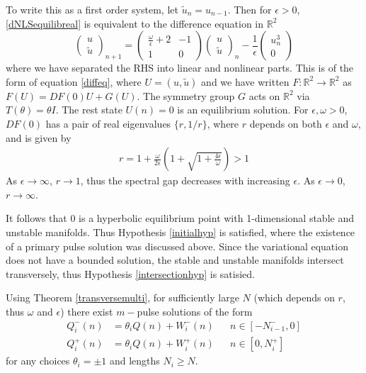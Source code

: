 \documentclass[12pt]{article}
\def\R{{\mathbb R}}
\begin{document}
To write this as a first order system, let $\tilde{u}_n = u_{n-1}$. Then for $\epsilon > 0$, \eqref{dNLSequilibreal} is equivalent to the difference equation in $\R^2$
\begin{equation}\label{dnlsdiffR2}
\begin{pmatrix}
u \\ \tilde{u}
\end{pmatrix}_{n+1} =
\begin{pmatrix}
\frac{\omega}{\epsilon} + 2 & -1 \\
1 & 0
\end{pmatrix}
\begin{pmatrix}
u \\ \tilde{u}
\end{pmatrix}_n
- \frac{1}{\epsilon} 
\begin{pmatrix}
u_n^3 \\ 0
\end{pmatrix}
\end{equation}
where we have separated the RHS into linear and nonlinear parts. This is of the form of equation \eqref{diffeq}, where $U = (u, \tilde{u})$ and we have written $F: \R^2 \rightarrow \R^2$ as $F(U) = DF(0) U + G(U)$. The symmetry group $G$ acts on $\R^2$ via $T(\theta) = \theta I$. The rest state $U(n) = 0$ is an equilibrium solution. For $\epsilon, \omega > 0$, $DF(0)$ has a pair of real eigenvalues $\{r, 1/r \}$, where $r$ depends on both $\epsilon$ and $\omega$, and is given by
\begin{align}\label{defr}
r = 1 + \frac{\omega}{2 \epsilon} \left( 1 + \sqrt{1 + \frac{4 \epsilon}{\omega}} \right) > 1
\end{align}
As $\epsilon \rightarrow \infty$, $r \rightarrow 1$, thus the spectral gap decreases with increasing $\epsilon$. As $\epsilon \rightarrow 0$, $r \rightarrow \infty$.

It follows that 0 is a hyperbolic equilibrium point with 1-dimensional stable and unstable manifolds. Thus Hypothesis \ref{initialhyp} is satisfied, where the existence of a primary pulse solution was discussed above. Since the variational equation does not have a bounded solution, the stable and unstable manifolds intersect transversely, thus Hypothesis \ref{intersectionhyp} is satisied. 

Using Theorem \ref{transversemulti}, for sufficiently large $N$ (which depends on $r$, thus $\omega$ and $\epsilon$) there exist $m-$pulse solutions of the form
\begin{align*}
Q_i^-(n) &= \theta_i Q(n) + W_i^-(n) && n \in [-N_{i-1}^-, 0] \\
Q_i^+(n) &= \theta_i Q(n) + W_i^+(n) && n \in [0, N_i^+]
\end{align*}
for any choices $\theta_i = \pm 1$ and lengths $N_i \geq N$. 
\end{document}
